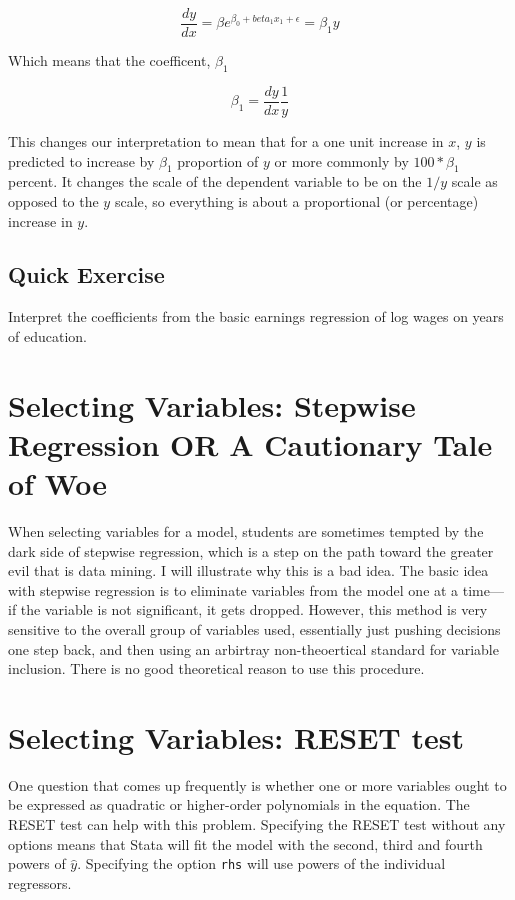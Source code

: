 \documentclass[12pt]{article}
\begin{document}
\begin{equation*}
  \frac{dy}{dx}=\beta e^{\beta_0+beta_1x_1+\epsilon}=\beta_1y
\end{equation*}

Which means that the coefficent, $\beta_1$

\begin{equation*}
  \beta_1=\frac{dy}{dx}\frac{1}{y}
\end{equation*}

This changes our interpretation to mean that for a one unit increase
in $x$, $y$ is predicted to increase by $\beta_1$ proportion of $y$ or
more commonly by $100*\beta_1$ percent. It changes the scale of the
dependent variable to be on the $1/y$ scale as opposed to the $y$
scale, so everything is about a proportional (or percentage) increase
in $y$. 

\subsection{Quick Exercise}
\label{sec:quick-exercise}

Interpret the coefficients from the basic earnings regression of log
wages on years of education. 


\section{Selecting Variables: Stepwise Regression OR A Cautionary Tale of Woe}
\label{sec:select-vari-stepw}

When selecting variables for a model, students are sometimes tempted
by the dark side of stepwise regression, which is a step on the path
toward the greater evil that is data mining. I will illustrate why
this is a bad idea. The basic idea with stepwise regression is to
eliminate variables from the model one at a time---if the variable is
not significant, it gets dropped. However, this method is very
sensitive to the overall group of variables used, essentially just
pushing decisions one step back, and then using an arbirtray
non-theoertical standard for variable inclusion. There is no good theoretical
reason to use this procedure. 

\section{Selecting Variables: RESET  test}
\label{sec:select-vari-reset}

One question that comes up frequently is whether one or more variables
ought to be expressed as quadratic or higher-order polynomials in the
equation. The RESET test can help with this problem. Specifying the
RESET test without any options means that Stata will fit the model
with the second, third and fourth powers of $\hat{y}$. Specifying the
option \texttt{rhs} will use powers of the individual regressors.
\end{document}
